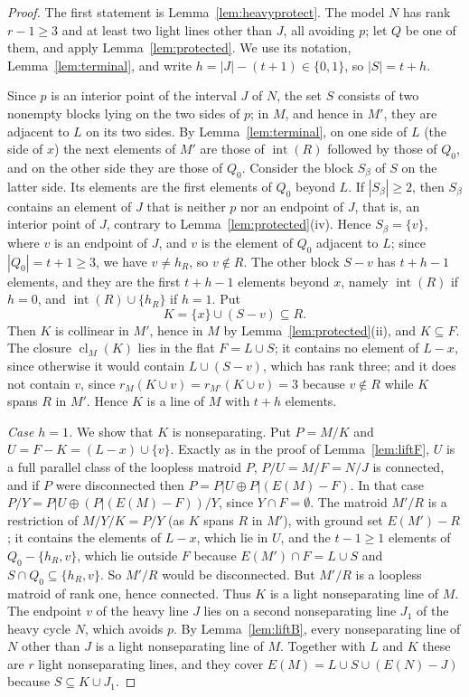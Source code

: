 \documentclass[11pt]{amsart}
\theoremstyle{definition}
\theoremstyle{remark}
\numberwithin{equation}{section}
\newcommand{\cl}{\operatorname{cl}}
\begin{document}
\begin{proof}
The first statement is Lemma~\ref{lem:heavyprotect}. The model $N$ has rank $r-1\ge3$ and at least two light lines other than $J$, all avoiding $p$; let $Q$ be one of them, and apply Lemma~\ref{lem:protected}. We use its notation, Lemma~\ref{lem:terminal}, and write $h=|J|-(t+1)\in\{0,1\}$, so $|S|=t+h$.

Since $p$ is an interior point of the interval $J$ of $N$, the set $S$ consists of two nonempty blocks lying on the two sides of $p$; in $M$, and hence in $M'$, they are adjacent to $L$ on its two sides. By Lemma~\ref{lem:terminal}, on one side of $L$ (the side of $x$) the next elements of $M'$ are those of $\operatorname{int}(R)$ followed by those of $Q_0$, and on the other side they are those of $Q_0$. Consider the block $S_\beta$ of $S$ on the latter side. Its elements are the first elements of $Q_0$ beyond $L$. If $|S_\beta|\ge2$, then $S_\beta$ contains an element of $J$ that is neither $p$ nor an endpoint of $J$, that is, an interior point of $J$, contrary to Lemma~\ref{lem:protected}(iv). Hence $S_\beta=\{v\}$, where $v$ is an endpoint of $J$, and $v$ is the element of $Q_0$ adjacent to $L$; since $|Q_0|=t+1\ge3$, we have $v\ne h_R$, so $v\notin R$. The other block $S-v$ has $t+h-1$ elements, and they are the first $t+h-1$ elements beyond $x$, namely $\operatorname{int}(R)$ if $h=0$, and $\operatorname{int}(R)\cup\{h_R\}$ if $h=1$. Put
\[
K=\{x\}\cup(S-v)\subseteq R .
\]
Then $K$ is collinear in $M'$, hence in $M$ by Lemma~\ref{lem:protected}(ii), and $K\subseteq F$. The closure $\cl_M(K)$ lies in the flat $F=L\cup S$; it contains no element of $L-x$, since otherwise it would contain $L\cup(S-v)$, which has rank three; and it does not contain $v$, since $r_M(K\cup v)=r_{M'}(K\cup v)=3$ because $v\notin R$ while $K$ spans $R$ in $M'$. Hence $K$ is a line of $M$ with $t+h$ elements.

\emph{Case $h=1$.} We show that $K$ is nonseparating. Put $P=M/K$ and $U=F-K=(L-x)\cup\{v\}$. Exactly as in the proof of Lemma~\ref{lem:liftF}, $U$ is a full parallel class of the loopless matroid $P$, $P/U=M/F=N/J$ is connected, and if $P$ were disconnected then $P=P|U\oplus P|(E(M)-F)$. In that case $P/Y=P|U\oplus(P|(E(M)-F))/Y$, since $Y\cap F=\emptyset$. The matroid $M'/R$ is a restriction of $M/Y/K=P/Y$ (as $K$ spans $R$ in $M'$), with ground set $E(M')-R$; it contains the elements of $L-x$, which lie in $U$, and the $t-1\ge1$ elements of $Q_0-\{h_R,v\}$, which lie outside $F$ because $E(M')\cap F=L\cup S$ and $S\cap Q_0\subseteq\{h_R,v\}$. So $M'/R$ would be disconnected. But $M'/R$ is a loopless matroid of rank one, hence connected. Thus $K$ is a light nonseparating line of $M$. The endpoint $v$ of the heavy line $J$ lies on a second nonseparating line $J_1$ of the heavy cycle $N$, which avoids $p$. By Lemma~\ref{lem:liftB}, every nonseparating line of $N$ other than $J$ is a light nonseparating line of $M$. Together with $L$ and $K$ these are $r$ light nonseparating lines, and they cover $E(M)=L\cup S\cup(E(N)-J)$ because $S\subseteq K\cup J_1$.


\end{proof}
\end{document}
